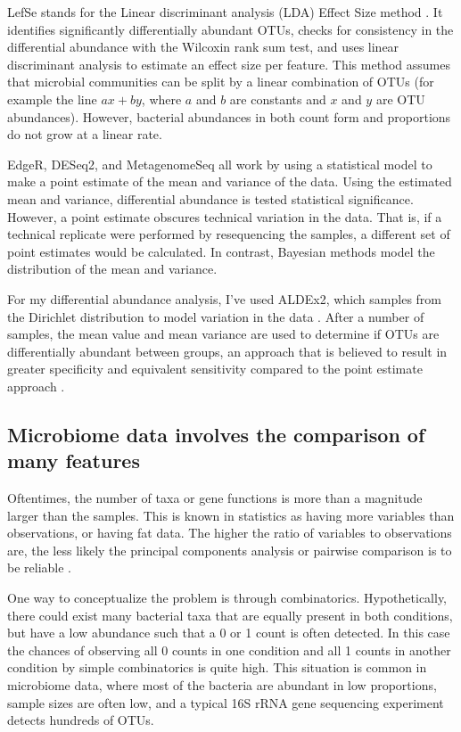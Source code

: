 LefSe stands for the Linear discriminant analysis (LDA) Effect Size method \cite{segata2011metagenomic}. It identifies significantly differentially abundant OTUs, checks for consistency in the differential abundance with the Wilcoxin rank sum test, and uses linear discriminant analysis to estimate an effect size per feature. This method assumes that microbial communities can be split by a linear combination of OTUs (for example the line $ax + by$, where $a$ and $b$ are constants and $x$ and $y$ are OTU abundances). However, bacterial abundances in both count form and proportions do not grow at a linear rate.

EdgeR, DESeq2, and MetagenomeSeq all work by using a statistical model to make a point estimate of the mean and variance of the data. Using the estimated mean and variance, differential abundance is tested statistical significance. However, a point estimate obscures technical variation in the data. That is, if a technical replicate were performed by resequencing the samples, a different set of point estimates would be calculated. In contrast, Bayesian methods model the distribution of the mean and variance.

For my differential abundance analysis, I’ve used ALDEx2, which samples from the Dirichlet distribution to model variation in the data \cite{fernandes2014unifying}. After a number of samples, the mean value and mean variance are used to determine if OTUs are differentially abundant between groups, an approach that is believed to result in greater specificity and equivalent sensitivity compared to the point estimate approach \cite{fernandes2014unifying}.

\subsection{Microbiome data involves the comparison of many features}
Oftentimes, the number of taxa or gene functions is more than a magnitude larger than the samples. This is known in statistics as having more variables than observations, or having fat data. The higher the ratio of variables to observations are, the less likely the principal components analysis or pairwise comparison is to be reliable \cite{osborne2004sample}.

One way to conceptualize the problem is through combinatorics. Hypothetically, there could exist many bacterial taxa that are equally present in both conditions, but have a low abundance such that a 0 or 1 count is often detected. In this case the chances of observing all 0 counts in one condition and all 1 counts in another condition by simple combinatorics is quite high. This situation is common in microbiome data, where most of the bacteria are abundant in low proportions, sample sizes are often low, and a typical 16S rRNA gene sequencing experiment detects hundreds of OTUs.

